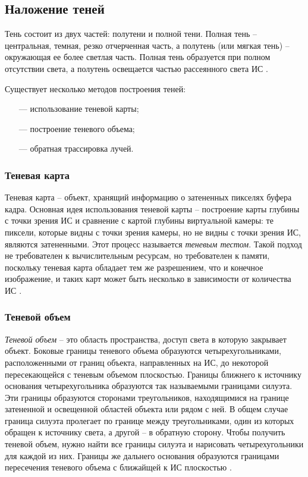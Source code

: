 \subsection*{Наложение теней}

Тень состоит из двух частей: полутени и полной тени. Полная тень -- центральная, темная, резко отчерченная часть, а полутень (или мягкая тень) -- окружающая ее более светлая часть. Полная тень образуется при полном отсутствии света, а полутень освещается частью рассеянного света ИС \cite{rogers}.

Существует несколько методов построения теней:

\begin{itemize}
	\item[---] использование теневой карты;
	\item[---] построение теневого объема;
	\item[---] обратная трассировка лучей.
\end{itemize}

\subsubsection*{Теневая карта}

Теневая карта -- объект, хранящий информацию о затененных пикселях буфера кадра. Основная идея использования теневой карты -- построение карты глубины с точки зрения ИС и сравнение с картой глубины виртуальной камеры: те пиксели, которые видны с точки зрения камеры, но не видны с точки зрения ИС, являются затененными. Этот процесс называется \textit{теневым тестом}. Такой подход не требователен к вычислительным ресурсам, но требователен к памяти, поскольку теневая карта обладает тем же разрешением, что и конечное изображение, и таких карт может быть несколько в зависимости от количества ИС \cite{engel2008programming}.

\subsubsection*{Теневой объем}

\textit{Теневой объем} -- это область пространства, доступ света в которую закрывает объект. Боковые границы теневого объема образуются четырехугольниками, расположенными от границ объекта, направленных на ИС, до некоторой пересекающейся с теневым объемом плоскостью. Границы ближнего к источнику основания четырехугольника образуются так называемыми границами силуэта. Эти границы образуются сторонами треугольников, находящимися на границе затененной и освещенной областей объекта или рядом с ней. В общем случае граница силуэта пролегает по границе между треугольниками, один из которых обращен к источнику света, а другой -- в обратную сторону. Чтобы получить теневой объем, нужно найти все границы силуэта и нарисовать четырехугольники для каждой из них. Границы же дальнего основания образуются границами пересечения теневого объема с ближайщей к ИС плоскостью \cite{shad_vol}.

